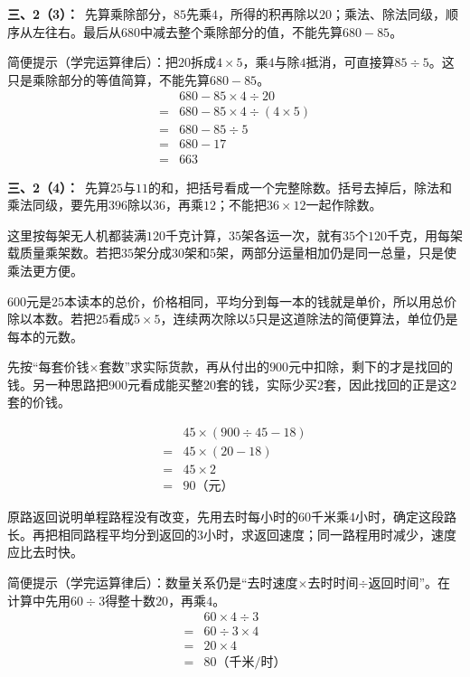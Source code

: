 \documentclass[multi=snippet,border=0pt]{standalone}
\newenvironment{snippet}[3]{\begin{minipage}{#1bp}\color{answerred}\fontsize{#2}{#3}\selectfont\raggedright}{\end{minipage}}
\begin{document}
\begin{snippet}{505}{11.5}{14}\textbf{三、2（3）：}\ 先算乘除部分，\(85\)先乘\(4\)，所得的积再除以\(20\)；乘法、除法同级，顺序从左往右。最后从\(680\)中减去整个乘除部分的值，不能先算\(680-85\)。\par 简便提示（学完运算律后）：把\(20\)拆成\(4\times5\)，乘\(4\)与除\(4\)抵消，可直接算\(85\div5\)。这只是乘除部分的等值简算，不能先算\(680-85\)。\[\begin{aligned}&680-85\times4\div20\\={}&680-85\times4\div(4\times5)\\={}&680-85\div5\\={}&680-17\\={}&663\end{aligned}\]\end{snippet}
\begin{snippet}{505}{11.5}{14}\textbf{三、2（4）：}\ 先算\(25\)与\(11\)的和，把括号看成一个完整除数。括号去掉后，除法和乘法同级，要先用\(396\)除以\(36\)，再乘\(12\)；不能把\(36\times12\)一起作除数。\end{snippet}
\begin{snippet}{505}{11.5}{14}这里按每架无人机都装满\(120\)千克计算，\(35\)架各运一次，就有\(35\)个\(120\)千克，用每架载质量乘架数。若把\(35\)架分成\(30\)架和\(5\)架，两部分运量相加仍是同一总量，只是使乘法更方便。\end{snippet}
\begin{snippet}{505}{11.5}{14}\(600\)元是\(25\)本读本的总价，价格相同，平均分到每一本的钱就是单价，所以用总价除以本数。若把\(25\)看成\(5\times5\)，连续两次除以\(5\)只是这道除法的简便算法，单位仍是每本的元数。\end{snippet}
\begin{snippet}{505}{11.5}{14}先按“每套价钱\(\times\)套数”求实际货款，再从付出的\(900\)元中扣除，剩下的才是找回的钱。另一种思路把\(900\)元看成能买整\(20\)套的钱，实际少买\(2\)套，因此找回的正是这\(2\)套的价钱。\par \[\begin{aligned}&45\times(900\div45-18)\\={}&45\times(20-18)\\={}&45\times2\\={}&90\text{（元）}\end{aligned}\]\end{snippet}
\begin{snippet}{505}{11.5}{14}原路返回说明单程路程没有改变，先用去时每小时的\(60\)千米乘\(4\)小时，确定这段路长。再把相同路程平均分到返回的\(3\)小时，求返回速度；同一路程用时减少，速度应比去时快。\par 简便提示（学完运算律后）：数量关系仍是“去时速度\(\times\)去时时间\(\div\)返回时间”。在计算中先用\(60\div3\)得整十数\(20\)，再乘\(4\)。\[\begin{aligned}&60\times4\div3\\={}&60\div3\times4\\={}&20\times4\\={}&80\text{（千米/时）}\end{aligned}\]\end{snippet}
\end{document}
